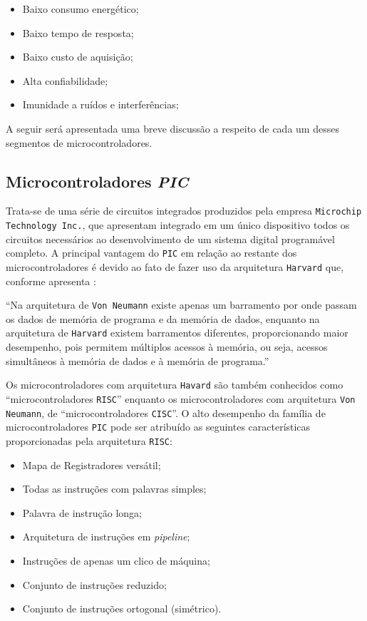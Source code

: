 \begin{itemize}

	\item Baixo consumo energético;
	\item Baixo tempo de resposta;
	\item Baixo custo de aquisição;
	\item Alta confiabilidade;
	\item Imunidade a ruídos e interferências;

\end{itemize}

A seguir será apresentada uma breve discussão a respeito de cada um desses segmentos de microcontroladores.

\subsection{Microcontroladores \textit{PIC}}

Trata-se de uma série de circuitos integrados produzidos pela empresa \texttt{Microchip Technology Inc.}, que apresentam integrado em um único dispositivo todos os circuitos necessários ao desenvolvimento de um sistema digital programável completo. 
A principal vantagem do \texttt{PIC} em relação ao restante dos microcontroladores é devido ao fato de fazer uso da arquitetura \texttt{Harvard} que, conforme apresenta \cite[p.~27]{andrade2006}:

\begin{citacao}
``Na arquitetura de \texttt{Von Neumann} existe apenas um barramento por onde passam os
dados de memória de programa e da memória de dados, enquanto na arquitetura de
\texttt{Harvard} existem barramentos diferentes, proporcionando maior desempenho, pois
permitem múltiplos acessos à memória, ou seja, acessos simultâneos à memória de
dados e à memória de programa.''
\end{citacao}

Os microcontroladores com arquitetura \texttt{Havard} são também conhecidos como “microcontroladores \texttt{RISC}” enquanto os microcontroladores com arquitetura \texttt{Von Neumann}, de “microcontroladores \texttt{CISC}”. O alto desempenho da família de microcontroladores \texttt{PIC} pode ser atribuído as seguintes características proporcionadas pela arquitetura \texttt{RISC}:

\begin{itemize}

	\item Mapa de Registradores versátil;
	\item Todas as instruções com palavras simples;
	\item Palavra de instrução longa;
	\item Arquitetura de instruções em \textit{pipeline};
	\item Instruções de apenas um clico de máquina;
	\item Conjunto de instruções reduzido;
	\item Conjunto de instruções ortogonal (simétrico).

\end{itemize}

